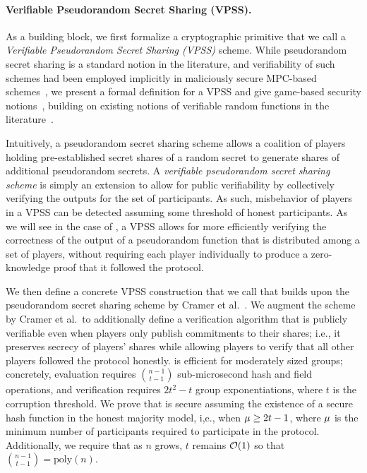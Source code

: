 \paragraph{\bf Verifiable Pseudorandom Secret Sharing (VPSS).}
As a building block,
we first formalize a cryptographic primitive that we call a \emph{Verifiable Pseudorandom Secret Sharing (VPSS)} scheme.
While pseudorandom secret sharing is a standard notion in the literature,
and verifiability of such schemes had been employed implicitly in maliciously secure MPC-based schemes~\cite{BenhamoudaBGHIN21},
we present a formal definition for a VPSS and
give game-based security notions~\cite{BellareR06},
building on existing notions of verifiable random functions in the literature~\cite{MicaliRV99,NaorPR99,Dodis03,GalindoLOW21}.

Intuitively, a pseudorandom secret sharing scheme allows a coalition of players holding pre-established secret shares of a random secret to generate shares of additional pseudorandom secrets.
%
A \emph{verifiable pseudorandom secret sharing scheme} is simply an extension
to allow for public verifiability by collectively verifying the outputs for the set of participants.
As such, misbehavior of players in a VPSS can be detected assuming some threshold of honest participants.
As we will see in the case of \glitter,
a VPSS allows for more efficiently verifying the correctness of the output of a pseudorandom function that is distributed among a set of players,
without requiring each player individually to produce a zero-knowledge proof that it followed the protocol.

We then define a concrete VPSS construction that we call \DVRFOne
that builds upon the pseudorandom secret sharing scheme by Cramer et al.~\cite{CramerDI05}.
We augment the scheme by Cramer et al.\ to additionally define a verification algorithm that is publicly verifiable even when players only publish commitments to their shares;
i.e., it preserves secrecy of players' shares while allowing players to verify that all other players followed the protocol honestly.
\DVRFOne is efficient for moderately sized groups;
concretely, evaluation requires ${n-1\choose t-1}$ sub-microsecond
hash and field operations,
and verification requires $2t^2 - t$ group exponentiations,
where $t$ is the corruption threshold.
We prove that \DVRFOne is secure assuming the existence of a secure hash function in the honest majority model,
i,e.,
when $\mu \geq 2t-1$,
where $\mu$ is the minimum number of participants required to participate in the protocol.
Additionally, we require that as $n$ grows, $t$ remains $\mathcal{O}(1)$ so that
${n-1\choose t-1} = \text{poly}(n)$.


